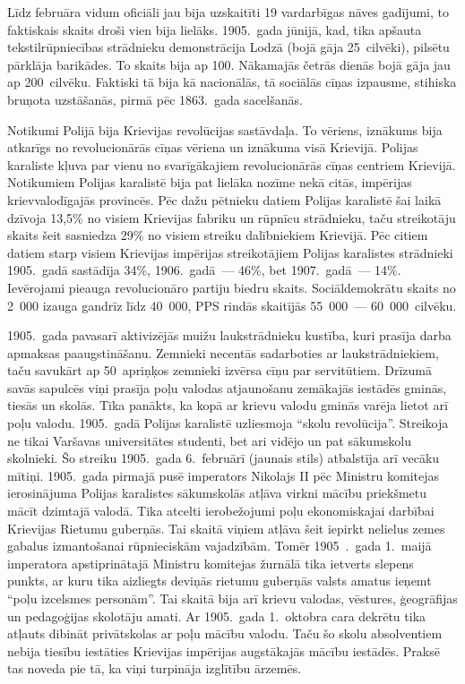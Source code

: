 \documentclass[twoside,a5paper,12pt,fleqn,openany]{extbook}
\begin{document}
Līdz februāra vidum oficiāli jau bija uzskaitīti 19 vardarbīgas nāves gadījumi, to faktiskais skaits droši vien bija lielāks. 1905.~gada jūnijā, kad, tika apšauta tekstilrūpniecības strādnieku demonstrācija Lodzā (bojā gāja 25~cilvēki), pilsētu pārklāja barikādes. To skaits bija ap 100. Nākamajās četrās dienās bojā gāja jau ap 200~cilvēku. Faktiski tā bija kā nacionālās, tā sociālās cīņas izpausme, stihiska bruņota uzstāšanās, pirmā pēc 1863.~gada sacelšanās.

Notikumi Polijā bija Krievijas revolūcijas sastāvdaļa. To vēriens, iznākums bija atkarīgs no revolucionārās cīņas vēriena un iznākuma visā Krievijā. Polijas karaliste kļuva par vienu no svarīgākajiem revolucionārās cīņas centriem Krievijā. Notikumiem Polijas karalistē bija pat lielāka nozīme nekā citās, impērijas krievvalodīgajās provincēs. Pēc dažu pētnieku datiem Polijas karalistē šai laikā dzīvoja 13,5\% no visiem Krievijas fabriku un rūpnīcu strādnieku, taču streikotāju skaits šeit sasniedza 29\% no visiem streiku dalībniekiem Krievijā. Pēc citiem datiem starp visiem Krievijas impērijas streikotājiem Polijas karalistes strādnieki 1905.~gadā sastādīja 34\%, 1906.~gadā~--- 46\%, bet 1907.~gadā~--- 14\%. Ievērojami pieauga revolucionāro partiju biedru skaits. Sociāldemokrātu skaits no 2~000 izauga gandrīz līdz 40~000, PPS rindās skaitījās 55~000~--- 60~000~cilvēku.

1905.~gada pavasarī aktivizējās muižu laukstrādnieku kustība, kuri prasīja darba apmaksas paaugstināšanu. Zemnieki necentās sadarboties ar laukstrādniekiem, taču savukārt ap 50~apriņķos zemnieki izvērsa cīņu par servitūtiem. Drīzumā savās sapulcēs viņi prasīja poļu valodas atjaunošanu zemākajās iestādēs gminās, tiesās un skolās. Tika panākts, ka kopā ar krievu valodu gminās varēja lietot arī poļu valodu. 1905.~gadā Polijas karalistē uzliesmoja ``skolu revolūcija''. Streikoja ne tikai Varšavas universitātes studenti, bet ari vidējo un pat sākumskolu skolnieki. Šo streiku 1905.~gada 6.~februārī (jaunais stils) atbalstīja arī vecāku mītiņi. 1905.~gada pirmajā pusē imperators Nikolajs II pēc Ministru komitejas ierosinājuma Polijas karalistes sākumskolās atļāva virkni mācību priekšmetu mācīt dzimtajā valodā. Tika atcelti ierobežojumi poļu ekonomiskajai darbībai Krievijas Rietumu guberņās. Tai skaitā viņiem atļāva šeit iepirkt nelielus zemes gabalus izmantošanai rūpnieciskām vajadzībām. Tomēr 1905~.~gada 1.~maijā imperatora apstiprinātajā Ministru komitejas žurnālā tika ietverts slepens punkts, ar kuru tika aizliegts deviņās rietumu guberņās valsts amatus ieņemt ``poļu izcelsmes personām''. Tai skaitā bija arī krievu valodas, vēstures, ģeogrāfijas un pedagoģijas skolotāju amati. Ar 1905.~gada 1.~oktobra cara dekrētu tika atļauts dibināt privātskolas ar poļu mācību valodu. Taču šo skolu absolventiem nebija tiesību iestāties Krievijas impērijas augstākajās mācību iestādēs. Praksē tas noveda pie tā, ka viņi turpināja izglītību ārzemēs.
\end{document}
